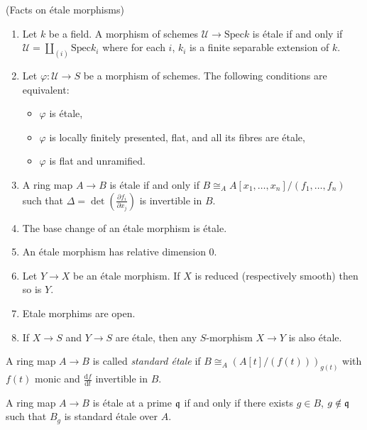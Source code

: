 \begin{proposition}
\label{proposition-etale-morphisms}
(Facts on \'etale morphisms)
\begin{enumerate}
\item
Let $k$ be a field. A morphism of schemes $\mathcal{U} \to \text{Spec} k$ is
\'etale if and only if $\mathcal{U} = \coprod_{(i)} \text{Spec} k_i$ where for
each $i$, $k_i$ is a finite separable extension of $k$.
\item
Let $\varphi : \mathcal{U} \to S$ be a morphism of schemes. The following
conditions are equivalent:
\begin{itemize}
\item $\varphi$ is \'etale,
\item $\varphi$ is locally finitely presented, flat, and all its fibres are
\'etale,
\item $\varphi$ is flat and unramified.
\end{itemize}
\item
A ring map $A \to B$ is \'etale if and only if $B \cong_A A[x_1,
\dots,x_n]/(f_1,\dots,f_n)$ such that $\Delta = \det \left( \frac{\partial
f_i}{\partial x_j} \right) $ is invertible in $B$.
\item
The base change of an \'etale morphism is \'etale.
\item
An \'etale morphism has relative dimension 0.
\item
Let $Y \to X$ be an \'etale morphism. If $X$ is reduced (respectively smooth)
then so is $Y$.
\item
Etale morphims are open.
\item
If $X\to S$ and $Y\to S$ are \'etale, then any $S$-morphism $X \to Y$ is also
\'etale.
\end{enumerate}
\end{proposition}

\begin{definition}
\label{definition-standard-etale}
A ring map $A \to B$ is called {\it standard \'etale} if $B \cong_A \left(
A[t]/(f(t)) \right)_{g(t)}$ with $f(t)$ monic and
$\frac{\mathrm{d}f}{\mathrm{d}t}$ invertible in $B$.
\end{definition}

\begin{theorem}
\label{theorem-standard-etale}
A ring map $A \to B$ is \'etale at a prime $\frak q$ if and only if there
exists $g \in B$, $g \notin \frak q$ such that $B_g$ is standard
\'etale over $A$.
\end{theorem}





